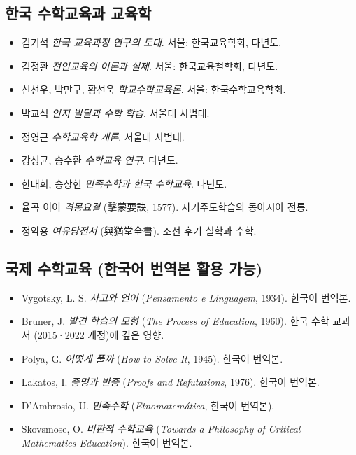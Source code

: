 \documentclass[12pt,a4paper]{scrartcl}
\begin{document}
\subsection{한국 수학교육과 교육학}
\begin{itemize}[leftmargin=1.3em,itemsep=0.15em,topsep=0.3em]
  \item 김기석 \emph{한국 교육과정 연구의 토대}. 서울: 한국교육학회, 다년도.
  \item 김정환 \emph{전인교육의 이론과 실제}. 서울: 한국교육철학회, 다년도.
  \item 신선우, 박만구, 황선욱 \emph{학교수학교육론}. 서울: 한국수학교육학회.
  \item 박교식 \emph{인지 발달과 수학 학습}. 서울대 사범대.
  \item 정영근 \emph{수학교육학 개론}. 서울대 사범대.
  \item 강성균, 송수환 \emph{수학교육 연구}. 다년도.
  \item 한대희, 송상헌 \emph{민족수학과 한국 수학교육}. 다년도.
  \item 율곡 이이 \emph{격몽요결} (擊蒙要訣, 1577). 자기주도학습의 동아시아 전통.
  \item 정약용 \emph{여유당전서} (與猶堂全書). 조선 후기 실학과 수학.
\end{itemize}

\subsection{국제 수학교육 (한국어 번역본 활용 가능)}
\begin{itemize}[leftmargin=1.3em,itemsep=0.15em,topsep=0.3em]
  \item Vygotsky, L. S. \emph{사고와 언어} (\emph{Pensamento e Linguagem}, 1934). 한국어 번역본.
  \item Bruner, J. \emph{발견 학습의 모형} (\emph{The Process of Education}, 1960). 한국 수학 교과서 (2015·2022 개정)에 깊은 영향.
  \item Polya, G. \emph{어떻게 풀까} (\emph{How to Solve It}, 1945). 한국어 번역본.
  \item Lakatos, I. \emph{증명과 반증} (\emph{Proofs and Refutations}, 1976). 한국어 번역본.
  \item D'Ambrosio, U. \emph{민족수학} (\emph{Etnomatemática}, 한국어 번역본).
  \item Skovsmose, O. \emph{비판적 수학교육} (\emph{Towards a Philosophy of Critical Mathematics Education}). 한국어 번역본.
\end{itemize}
\end{document}
